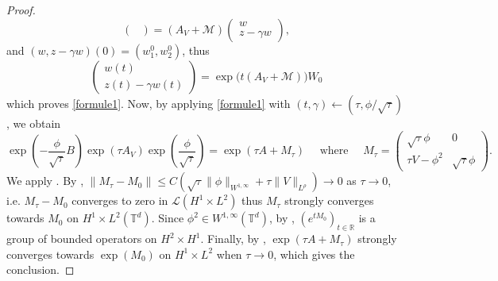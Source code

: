 \documentclass[10pt,a4paper]{amsart}
\newcommand{\R}{\mathbb{R}}
\newcommand{\T}{\mathbb{T}}
\begin{document}
\begin{proof}
$$\begin{pmatrix}
\end{pmatrix}
= (A_V+\mathcal{M}) \begin{pmatrix}
    w \\ z-\gamma w
\end{pmatrix},$$
and $(w,z-\gamma w)(0)=(w_1^0,w_2^0)$, thus
$$\begin{pmatrix}
    w(t) \\ z(t)-\gamma w(t)
\end{pmatrix}
= \exp \big(t(A_V+\mathcal{M}) \big) W_0$$
which proves \eqref{formule1}. Now, by applying \eqref{formule1} with $(t,\gamma) \leftarrow (\tau,\phi/\sqrt{\tau})$, we obtain
$$\exp \left(-\frac{\phi}{\sqrt{\tau}}B \right) \exp(\tau A_V) \exp \left( \frac{\phi}{\sqrt{\tau}} \right) 
= \exp(\tau A + M_{\tau}) 
\quad \text{ where } \quad
M_{\tau}=\begin{pmatrix}
\sqrt{\tau} \phi &  0 \\  \tau V  - \phi^2 & \sqrt{\tau} \phi
\end{pmatrix}.$$
We apply .
By ,
$\|M_{\tau}-M_0\| \leq C ( \sqrt{\tau}\|\phi\|_{W^{1,\infty}} + \tau \|V\|_{L^{\rho}} ) \to 0$ as $\tau \to 0$, i.e. $M_{\tau}-M_0$ converges to zero in $\mathcal{L}(H^1 \times L^2)$ thus $M_{\tau}$ strongly converges towards $M_0$ on  $H^1 \times L^2(\T^d)$. Since $\phi^2 \in W^{1,\infty}(\T^d)$, by , $(e^{tM_0})_{t\in\R}$ is a group of bounded operators on $H^2 \times H^1$. Finally, by , $\exp(\tau A+M_{\tau})$ strongly converges towards $\exp(M_0)$ on $H^1 \times L^2$ when $\tau \to 0$, which gives the conclusion.   
\end{proof}
\end{document}
